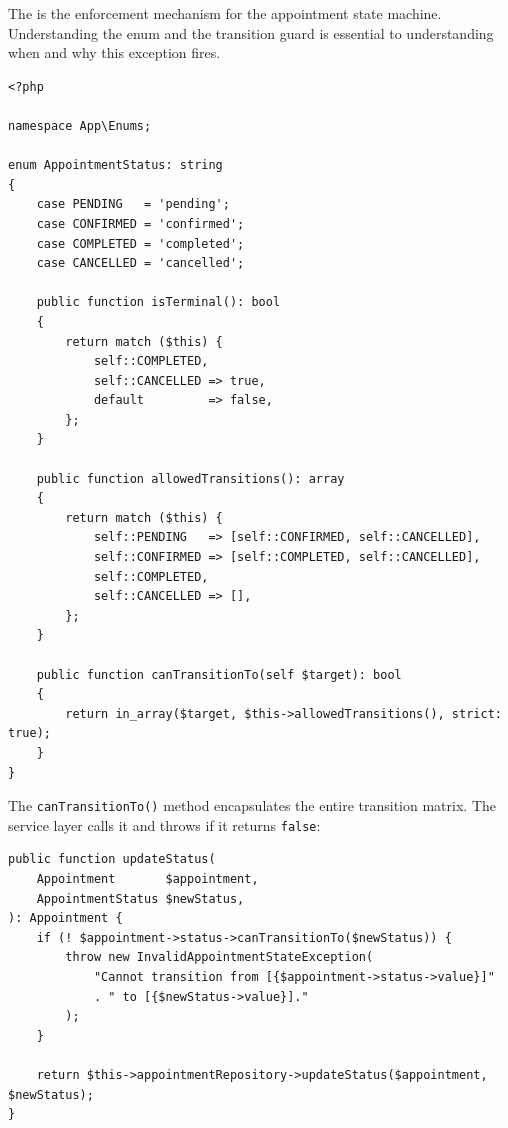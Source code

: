 The  is the enforcement
mechanism for the appointment state machine. Understanding the enum and
the transition guard is essential to understanding when and why this
exception fires.

\begin{lstlisting}[style=php, caption={\texttt{app/Enums/AppointmentStatus.php}
  --- Backed string enum encoding all valid appointment states.}]
<?php

namespace App\Enums;

enum AppointmentStatus: string
{
    case PENDING   = 'pending';
    case CONFIRMED = 'confirmed';
    case COMPLETED = 'completed';
    case CANCELLED = 'cancelled';

    public function isTerminal(): bool
    {
        return match ($this) {
            self::COMPLETED,
            self::CANCELLED => true,
            default         => false,
        };
    }

    public function allowedTransitions(): array
    {
        return match ($this) {
            self::PENDING   => [self::CONFIRMED, self::CANCELLED],
            self::CONFIRMED => [self::COMPLETED, self::CANCELLED],
            self::COMPLETED,
            self::CANCELLED => [],
        };
    }

    public function canTransitionTo(self $target): bool
    {
        return in_array($target, $this->allowedTransitions(), strict: true);
    }
}
\end{lstlisting}

The \texttt{canTransitionTo()} method encapsulates the entire transition
matrix. The service layer calls it and throws
 if it returns \texttt{false}:

\begin{lstlisting}[style=php, caption={State transition guard in
  \texttt{AppointmentService::updateStatus()}.}]
public function updateStatus(
    Appointment       $appointment,
    AppointmentStatus $newStatus,
): Appointment {
    if (! $appointment->status->canTransitionTo($newStatus)) {
        throw new InvalidAppointmentStateException(
            "Cannot transition from [{$appointment->status->value}]"
            . " to [{$newStatus->value}]."
        );
    }

    return $this->appointmentRepository->updateStatus($appointment, $newStatus);
}
\end{lstlisting}

